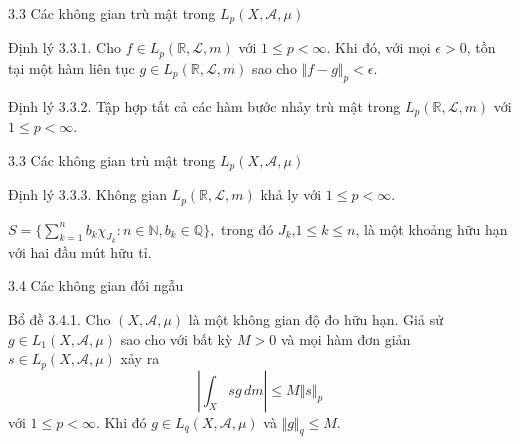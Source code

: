 \documentclass[notheorems,envcountsect,hyperref=unicode]{beamer}
\newcommand{\R}{\mathbb R}
\newcommand{\N}{\mathbb N}
\newcommand{\Q}{\mathbb Q}
\def\A{\mathcal{A}}
\def\R{\mathbb{R}}
\def\Q{\mathbb{Q}}
\def\N{\mathbb{N}}
\def\L{\mathcal{L}}
\def\Lpp{\mathit{L_p}}
\def\disint{\displaystyle\int}
\def\dissum{\displaystyle\sum}
\def\kgdd{(X,\A,\mu)}
\begin{document}
\begin{frame}{3.3 Các không gian trù mật trong $\Lpp\kgdd$ }
\begin{block}{\textnormal{Định lý 3.3.1.}}
Cho $f\in \Lpp(\R,\L,m)$ với $1\leq p<\infty$. Khi đó, với mọi $\epsilon>0$, tồn tại một hàm liên tục $g\in \Lpp(\R,\L,m)$ sao cho $\Vert f-g\Vert_p<\epsilon$.
\end{block}

\begin{block}{\textnormal{Định lý 3.3.2.}}
Tập hợp tất cả các hàm bước nhảy trù mật trong $\Lpp(\R,\L,m)$ với $1\leq p<\infty$.
\end{block}
\end{frame}


\begin{frame}{3.3 Các không gian trù mật trong $\Lpp\kgdd$ }
\begin{block}{\textnormal{Định lý 3.3.3.}}
Không gian $\Lpp(\R,\L,m)$ khả ly với $1\leq p<\infty$.
\end{block}
 $S=\lbrace \dissum_{k=1}^n b_k \chi_{J_k}:n\in\N,b_k\in\Q\rbrace,$ trong đó $J_k$,$1\leq k\leq n$, là một khoảng hữu hạn với hai đầu mút hữu tỉ.
\end{frame}

\begin{frame}{3.4 Các không gian đối ngẫu }
\begin{block}{\textnormal{Bổ đề 3.4.1.}}
Cho $\kgdd$ là một không gian độ đo hữu hạn. Giả sử $g\in \mathit{L}_1\kgdd$ sao cho với bất kỳ $M>0$ và mọi hàm đơn giản $s\in\Lpp\kgdd$ xảy ra $$\left\vert \disint_X sg\,dm\right\vert\leq M\Vert s\Vert_p$$
với $1\leq p<\infty$. Khi đó $g\in \mathit{L}_q\kgdd$ và $\Vert g\Vert_q\leq M$.
\end{block}
\end{frame}
\end{document}
